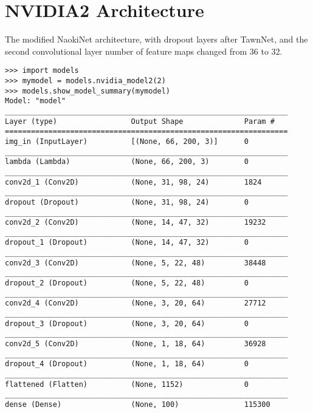 \section{NVIDIA2 Architecture}
\label{arc:nvidia2}
The modified NaokiNet architecture, with dropout layers after TawnNet, and the second convolutional layer number of feature maps changed from 36 to 32.
\begin{verbatim}
>>> import models
>>> mymodel = models.nvidia_model2(2)
>>> models.show_model_summary(mymodel)
Model: "model"
_________________________________________________________________
Layer (type)                 Output Shape              Param #   
=================================================================
img_in (InputLayer)          [(None, 66, 200, 3)]      0         
_________________________________________________________________
lambda (Lambda)              (None, 66, 200, 3)        0         
_________________________________________________________________
conv2d_1 (Conv2D)            (None, 31, 98, 24)        1824      
_________________________________________________________________
dropout (Dropout)            (None, 31, 98, 24)        0         
_________________________________________________________________
conv2d_2 (Conv2D)            (None, 14, 47, 32)        19232     
_________________________________________________________________
dropout_1 (Dropout)          (None, 14, 47, 32)        0         
_________________________________________________________________
conv2d_3 (Conv2D)            (None, 5, 22, 48)         38448     
_________________________________________________________________
dropout_2 (Dropout)          (None, 5, 22, 48)         0         
_________________________________________________________________
conv2d_4 (Conv2D)            (None, 3, 20, 64)         27712     
_________________________________________________________________
dropout_3 (Dropout)          (None, 3, 20, 64)         0         
_________________________________________________________________
conv2d_5 (Conv2D)            (None, 1, 18, 64)         36928     
_________________________________________________________________
dropout_4 (Dropout)          (None, 1, 18, 64)         0         
_________________________________________________________________
flattened (Flatten)          (None, 1152)              0         
_________________________________________________________________
dense (Dense)                (None, 100)               115300    

\end{verbatim}
